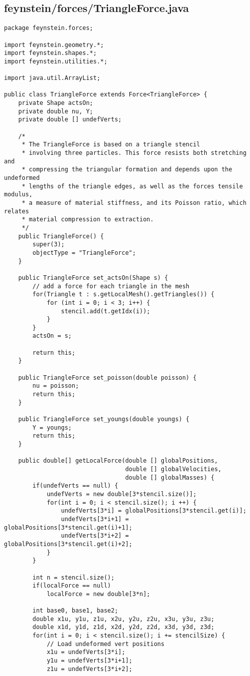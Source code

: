 \subsection*{feynstein/forces/TriangleForce.java}
\begin{lstlisting}
package feynstein.forces;

import feynstein.geometry.*;
import feynstein.shapes.*;
import feynstein.utilities.*;

import java.util.ArrayList;

public class TriangleForce extends Force<TriangleForce> {
    private Shape actsOn;
    private double nu, Y;
	private double [] undefVerts;
	
	/*
	 * The TriangleForce is based on a triangle stencil
	 * involving three particles. This force resists both stretching and
	 * compressing the triangular formation and depends upon the undeformed
	 * lengths of the triangle edges, as well as the forces tensile modulus,
	 * a measure of material stiffness, and its Poisson ratio, which relates
	 * material compression to extraction.
	 */
    public TriangleForce() {
		super(3);
		objectType = "TriangleForce";
    }

    public TriangleForce set_actsOn(Shape s) {
		// add a force for each triangle in the mesh
		for(Triangle t : s.getLocalMesh().getTriangles()) {
			for (int i = 0; i < 3; i++) {
				stencil.add(t.getIdx(i));
			}
		}
		actsOn = s;
		
		return this;
    }

    public TriangleForce set_poisson(double poisson) {
		nu = poisson;
		return this;
    }

    public TriangleForce set_youngs(double youngs) {
		Y = youngs;
		return this;
    }
	
	public double[] getLocalForce(double [] globalPositions,
								  double [] globalVelocities,
								  double [] globalMasses) {
		if(undefVerts == null) {
			undefVerts = new double[3*stencil.size()];
			for(int i = 0; i < stencil.size(); i ++) {
				undefVerts[3*i] = globalPositions[3*stencil.get(i)];
				undefVerts[3*i+1] = globalPositions[3*stencil.get(i)+1];
				undefVerts[3*i+2] = globalPositions[3*stencil.get(i)+2];
			}
		}
		
		int n = stencil.size();
		if(localForce == null)
			localForce = new double[3*n];
		
		int base0, base1, base2;
		double x1u, y1u, z1u, x2u, y2u, z2u, x3u, y3u, z3u;
		double x1d, y1d, z1d, x2d, y2d, z2d, x3d, y3d, z3d;
		for(int i = 0; i < stencil.size(); i += stencilSize) {
			// Load undeformed vert positions
			x1u = undefVerts[3*i];
			y1u = undefVerts[3*i+1];
			z1u = undefVerts[3*i+2];
			

\end{lstlisting}
